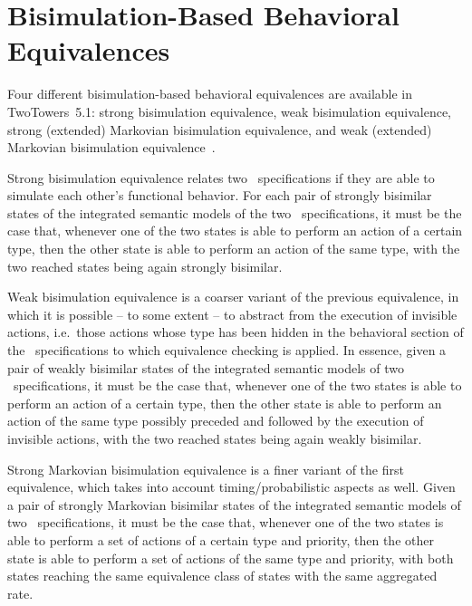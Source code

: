 \section{Bisimulation-Based Behavioral Equivalences}

Four different bisimulation-based behavioral equivalences are available in TwoTowers~5.1: strong
bisimulation equivalence, weak bisimulation equivalence, strong (extended) Markovian bisimulation
equivalence, and weak (extended) Markovian bisimulation equivalence~\cite{Mil,BB2,Ber3}.

Strong bisimulation equivalence relates two \aemilia\ specifications if they are able to simulate each
other's functional behavior. For each pair of strongly bisimilar states of the integrated semantic models of
the two \aemilia\ specifications, it must be the case that, whenever one of the two states is able to
perform an action of a certain type, then the other state is able to perform an action of the same type,
with the two reached states being again strongly bisimilar.

Weak bisimulation equivalence is a coarser variant of the previous equivalence, in which it is possible --
to some extent -- to abstract from the execution of invisible actions, i.e.\ those actions whose type has
been hidden in the behavioral section of the \aemilia\ specifications to which equivalence checking is
applied. In essence, given a pair of weakly bisimilar states of the integrated semantic models of two
\aemilia\ specifications, it must be the case that, whenever one of the two states is able to perform an
action of a certain type, then the other state is able to perform an action of the same type possibly
preceded and followed by the execution of invisible actions, with the two reached states being again weakly
bisimilar.

Strong Markovian bisimulation equivalence is a finer variant of the first equivalence, which takes into
account timing/probabilistic aspects as well. Given a pair of strongly Markovian bisimilar states of the
integrated semantic models of two \aemilia\ specifications, it must be the case that, whenever one of the
two states is able to perform a set of actions of a certain type and priority, then the other state is able
to perform a set of actions of the same type and priority, with both states reaching the same equivalence
class of states with the same aggregated rate.

